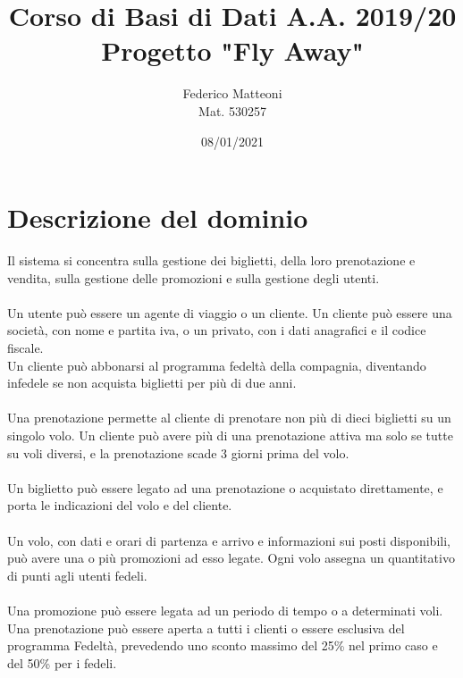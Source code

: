 \documentclass[10pt]{article}
\begin{document}
\renewcommand*\contentsname{Indice}
\title{Corso di Basi di Dati A.A. 2019/20\\Progetto "Fly Away"}
\author{Federico Matteoni\\Mat. 530257}
\date{08/01/2021}
\maketitle
\pagebreak
\section{Descrizione del dominio}
Il sistema si concentra sulla gestione dei biglietti, della loro prenotazione e vendita, sulla gestione delle promozioni e sulla gestione degli utenti.\\\\
Un utente può essere un agente di viaggio o un cliente. Un cliente può essere una società, con nome e partita iva, o un privato, con i dati anagrafici e il codice fiscale.\\
Un cliente può abbonarsi al programma fedeltà della compagnia, diventando infedele se non acquista biglietti per più di due anni.\\\\
Una prenotazione permette al cliente di prenotare non più di dieci biglietti su un singolo volo. Un cliente può avere più di una prenotazione attiva ma solo se tutte su voli diversi, e la prenotazione scade 3 giorni prima del volo.\\\\Un biglietto può essere legato ad una prenotazione o acquistato direttamente, e porta le indicazioni del volo e del cliente.\\\\
Un volo, con dati e orari di partenza e arrivo e informazioni sui posti disponibili, può avere una o più promozioni ad esso legate. Ogni volo assegna un quantitativo di punti agli utenti fedeli.\\\\Una promozione può essere legata ad un periodo di tempo o a determinati voli. Una prenotazione può essere aperta a tutti i clienti o essere esclusiva del programma Fedeltà, prevedendo uno sconto massimo del 25\% nel primo caso e del 50\% per i fedeli.
\end{document}
